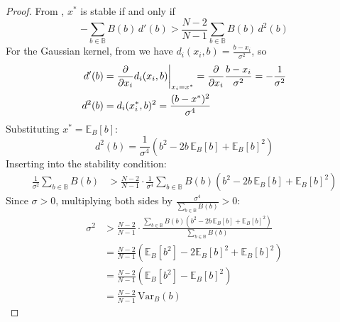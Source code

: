 \documentclass{article}
\begin{document}
            \begin{proof}
                From , $x^*$ is stable if and only if
                \begin{equation}
                    -\sum_{b\in\mathbb{B}} B(b)\,d'(b) > 
                    \frac{N-2}{N-1}\sum_{b\in\mathbb{B}} B(b)\,d^2(b)
                \end{equation}
                For the Gaussian kernel, from  we have $d_i(x_i,b) = \frac{b-x_i}{\sigma^2}$, so
                \begin{align}
                    d'(b) &= \pdv{}{x_i}d_i(x_i,b)\bigg|_{x_i=x^*} = 
                    \pdv{}{x_i}\frac{b-x_i}{\sigma^2} = -\frac{1}{\sigma^2} \\
                    d^2(b) &= d_i(x_i^*,b)^2 = \frac{(b-x^*)^2}{\sigma^4}
                \end{align}
                Substituting $x^* = \mathbb{E}_B[b]$:
                \begin{equation}
                    d^2(b) = \frac{1}{\sigma^4}\left(b^2 - 2b\,\mathbb{E}_B[b] + 
                    \mathbb{E}_B[b]^2\right)
                \end{equation}
                Inserting into the stability condition:
                \begin{align}
                    \frac{1}{\sigma^2}\sum_{b\in\mathbb{B}} B(b) &> 
                    \frac{N-2}{N-1}\cdot\frac{1}{\sigma^4}\sum_{b\in\mathbb{B}} 
                    B(b)\left(b^2 - 2b\,\mathbb{E}_B[b] + \mathbb{E}_B[b]^2\right)
                \end{align}
                Since $\sigma > 0$, multiplying both sides by $\frac{\sigma^4}{\sum_{b\in\mathbb{B}}B(b)} > 0$:
                \begin{align}
                    \sigma^2 &> \frac{N-2}{N-1}\cdot
                    \frac{\sum_{b\in\mathbb{B}} B(b)\left(b^2 - 2b\,\mathbb{E}_B[b] 
                    + \mathbb{E}_B[b]^2\right)}{\sum_{b\in\mathbb{B}} B(b)} \\
                    &= \frac{N-2}{N-1}\left(\mathbb{E}_B[b^2] - 2\mathbb{E}_B[b]^2 
                    + \mathbb{E}_B[b]^2\right) \\
                    &= \frac{N-2}{N-1}\left(\mathbb{E}_B[b^2] - 
                    \mathbb{E}_B[b]^2\right) \\
                    &= \frac{N-2}{N-1}\,\mathrm{Var}_B(b)
                \end{align}

\end{proof}
\end{document}
